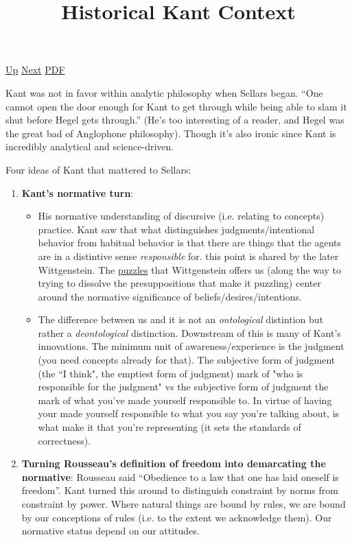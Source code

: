\documentclass[12pt,a4paper]{report}
\begin{document}
 \href{doc/phil/People/Brandom/OnSellars/2009/Lecture01.html}{Up} 
 \href{doc/phil/People/Brandom/OnSellars/2009/Lecture01/Sellarsquotes.html}{Next} 
 \href{doc/phil/People/Brandom/OnSellars/2009/Lecture01/HistoricalKantContext.pdf}{PDF} 
\title{Historical Kant Context}
Kant was not in favor within analytic philosophy when Sellars began. ``One cannot open the door enough for Kant to get through while being able to slam it shut before Hegel gets through.'' (He's too interesting of a reader, and Hegel was the great bad of Anglophone philosophy). Though it's also ironic since Kant is incredibly analytical and science-driven.

Four ideas of Kant that mattered to Sellars:
\begin{enumerate}
\item \textbf{Kant's normative turn}:
\begin{itemize}
\item His normative understanding of discursive (i.e. relating to concepts) practice. Kant saw that what distinguishes judgments/intentional behavior from habitual behavior is that there are things that the agents are in a distintive sense \emph{responsible} for. this point is shared by the later Wittgenstein. The \href{doc/phil/Phil Situations/Childrens Game.html}{puzzles} that Wittgenstein offers us (along the way to trying to dissolve the presuppositions that make it puzzling) center around the normative significance of beliefs/desires/intentions.

\item The difference between us and it is not an \emph{ontological} distintion but rather a \emph{deontological} distinction. Downstream of this is many of Kant's innovations. The minimum unit of awareness/experience is the judgment (you need concepts already for that). The subjective form of judgment (the ``I think", the emptiest form of judgment) mark of "who is responsible for the judgment" vs the subjective form of judgment the mark of what you've made yourself responsible to. In virtue of having your made yourself responsible to what you say you're talking about, is what make it that you're representing (it sets the standards of correctness).
\end{itemize}

\item \textbf{Turning Rousseau's definition of freedom into demarcating the normative}: Rousseau said ``Obedience to a law that one has laid oneself is freedom''. Kant turned this around to distinguish constraint by norms from constraint by power. Where natural things are bound by rules, we are bound by our conceptions of rules (i.e. to the extent we acknowledge them). Our normative status depend on our attitudes.


\end{enumerate}
\end{document}
